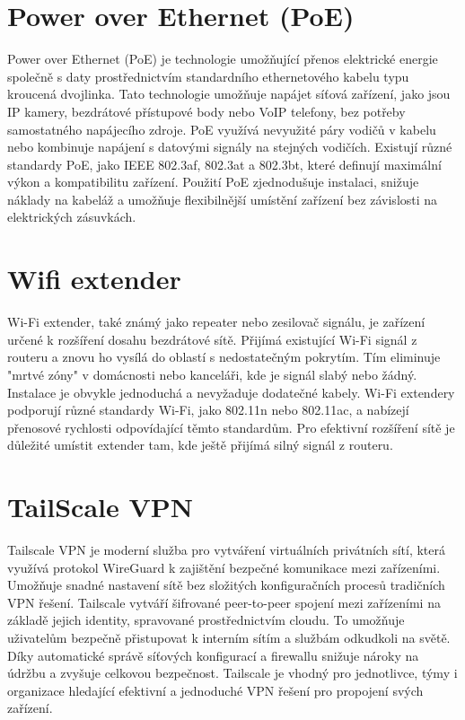 \section*{Power over Ethernet (PoE)}\label{sec:poe}
Power over Ethernet (PoE) je technologie umožňující přenos elektrické energie společně s daty prostřednictvím standardního ethernetového kabelu typu kroucená dvojlinka. Tato technologie umožňuje napájet síťová zařízení, jako jsou IP kamery, bezdrátové přístupové body nebo VoIP telefony, bez potřeby samostatného napájecího zdroje. PoE využívá nevyužité páry vodičů v kabelu nebo kombinuje napájení s datovými signály na stejných vodičích. Existují různé standardy PoE, jako IEEE 802.3af, 802.3at a 802.3bt, které definují maximální výkon a kompatibilitu zařízení. Použití PoE zjednodušuje instalaci, snižuje náklady na kabeláž a umožňuje flexibilnější umístění zařízení bez závislosti na elektrických zásuvkách.


\section*{Wifi extender}\label{sec:wifi-extender}
Wi-Fi extender, také známý jako repeater nebo zesilovač signálu, je zařízení určené k rozšíření dosahu bezdrátové sítě. Přijímá existující Wi-Fi signál z routeru a znovu ho vysílá do oblastí s nedostatečným pokrytím. Tím eliminuje "mrtvé zóny" v domácnosti nebo kanceláři, kde je signál slabý nebo žádný. Instalace je obvykle jednoduchá a nevyžaduje dodatečné kabely. Wi-Fi extendery podporují různé standardy Wi-Fi, jako 802.11n nebo 802.11ac, a nabízejí přenosové rychlosti odpovídající těmto standardům. Pro efektivní rozšíření sítě je důležité umístit extender tam, kde ještě přijímá silný signál z routeru.


\section*{TailScale VPN}\label{sec:tailscale}
Tailscale VPN je moderní služba pro vytváření virtuálních privátních sítí, která využívá protokol WireGuard k zajištění bezpečné komunikace mezi zařízeními. Umožňuje snadné nastavení sítě bez složitých konfiguračních procesů tradičních VPN řešení. Tailscale vytváří šifrované peer-to-peer spojení mezi zařízeními na základě jejich identity, spravované prostřednictvím cloudu. To umožňuje uživatelům bezpečně přistupovat k interním sítím a službám odkudkoli na světě. Díky automatické správě síťových konfigurací a firewallu snižuje nároky na údržbu a zvyšuje celkovou bezpečnost. Tailscale je vhodný pro jednotlivce, týmy i organizace hledající efektivní a jednoduché VPN řešení pro propojení svých zařízení.


